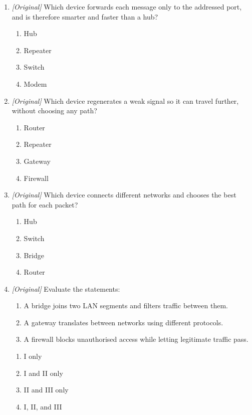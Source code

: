 \begin{enumerate}[label=\textbf{Q\arabic*.}, leftmargin=*]
\begin{enumerate}[label=\Alph*.]
    \item Router
    \item Firewall
  \end{enumerate}
\item \textit{[Original]} Which device forwards each message only to the
  addressed port, and is therefore smarter and faster than a hub?
  \begin{enumerate}[label=\Alph*.]
    \item Hub
    \item Repeater
    \item Switch
    \item Modem
  \end{enumerate}
\item \textit{[Original]} Which device regenerates a weak signal so it can
  travel further, without choosing any path?
  \begin{enumerate}[label=\Alph*.]
    \item Router
    \item Repeater
    \item Gateway
    \item Firewall
  \end{enumerate}
\item \textit{[Original]} Which device connects different networks and
  chooses the best path for each packet?
  \begin{enumerate}[label=\Alph*.]
    \item Hub
    \item Switch
    \item Bridge
    \item Router
  \end{enumerate}
\item \textit{[Original]} Evaluate the statements:
  \begin{enumerate}[label=\Roman*.]
    \item A bridge joins two LAN segments and filters traffic between them.
    \item A gateway translates between networks using different protocols.
    \item A firewall blocks unauthorised access while letting legitimate
      traffic pass.
  \end{enumerate}
  \begin{enumerate}[label=\Alph*.]
    \item I only
    \item I and II only
    \item II and III only
    \item I, II, and III

\end{enumerate}
\end{enumerate}
